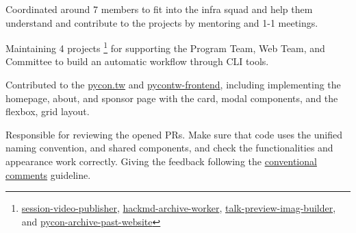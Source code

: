 \begin{zitemize}
\item Coordinated around 7 members to fit into the infra squad and help them understand and contribute to the projects by mentoring and 1-1 meetings.
\item Maintaining 4 projects \footnote{\href{https://github.com/pycontw/session-video-publisher}{session-video-publisher}, \href{https://github.com/pycontw/hackmd-archive-worker}{hackmd-archive-worker}, \href{https://github.com/pycontw/talk-preview-img-builder}{talk-preview-imag-builder}, and \href{https://github.com/pycontw/pycon_archive_past_website}{pycon-archive-past-website}} for supporting the Program Team, Web Team, and Committee to build an automatic workflow through CLI tools.
\end{zitemize}

\begin{zitemize}
\item Contributed to the \href{https://github.com/pycontw/pycon.tw}{pycon.tw} and \href{https://github.com/pycontw/pycontw-frontend}{pycontw-frontend}, including implementing the homepage, about, and sponsor page with the card, modal components, and the flexbox, grid layout.
\item Responsible for reviewing the opened PRs. Make sure that code uses the unified naming convention, and shared components, and check the functionalities and appearance work correctly. Giving the feedback following the \href{https://conventionalcomments.org/}{conventional comments} guideline.
\end{zitemize}